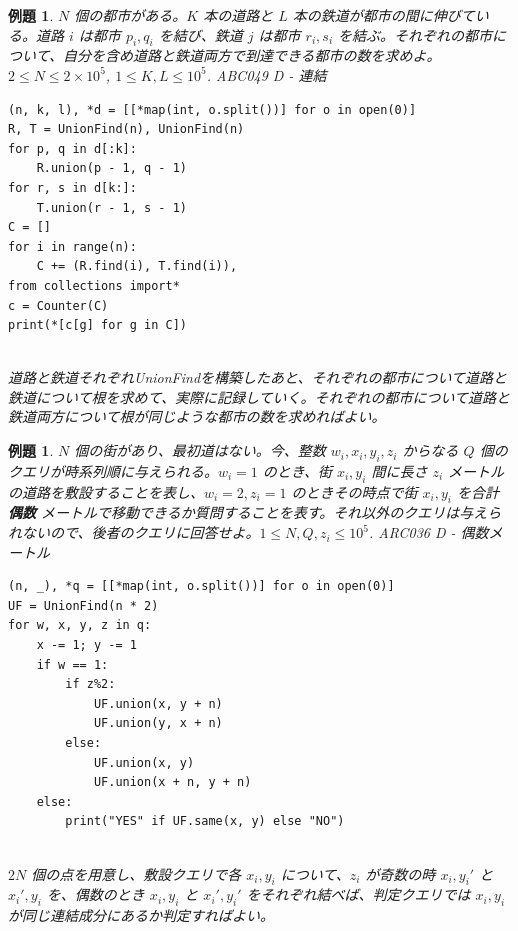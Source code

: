 \documentclass[12pt, a4j]{ltjsarticle}
\newtheorem{exm}[thm]{例題}
\newcommand*{\SS}{\vspace{1cm}}
\begin{document}
\SS

\begin{exm} $N$ 個の都市がある。$K$ 本の道路と $L$ 本の鉄道が都市の間に伸びている。道路 $i$ は都市 $p_i,q_i$ を結び、鉄道 $j$ は都市 $r_i,s_i$ を結ぶ。それぞれの都市について、自分を含め道路と鉄道両方で到達できる都市の数を求めよ。$2\le N \le 2\times 10^5$, $1\le K,L\le 10^5$. \upshape\quad ABC049 D - 連結\\
\begin{lstlisting}
(n, k, l), *d = [[*map(int, o.split())] for o in open(0)]
R, T = UnionFind(n), UnionFind(n)
for p, q in d[:k]:
    R.union(p - 1, q - 1)
for r, s in d[k:]:
    T.union(r - 1, s - 1)
C = []
for i in range(n):
    C += (R.find(i), T.find(i)),
from collections import*
c = Counter(C)
print(*[c[g] for g in C])
\end{lstlisting}\quad\\
道路と鉄道それぞれUnionFindを構築したあと、それぞれの都市について道路と鉄道について根を求めて、実際に記録していく。それぞれの都市について道路と鉄道両方について根が同じような都市の数を求めればよい。
\end{exm}

\SS

\begin{exm} $N$ 個の街があり、最初道はない。今、整数 $w_i,x_i,y_i,z_i$ からなる $Q$ 個のクエリが時系列順に与えられる。$w_i = 1$ のとき、街 $x_i,y_i$ 間に長さ $z_i$ メートルの道路を敷設することを表し、$w_i = 2, z_i = 1$ のときその時点で街 $x_i,y_i$ を合計 {\bf 偶数} メートルで移動できるか質問することを表す。それ以外のクエリは与えられないので、後者のクエリに回答せよ。$1\le N,Q,z_i\le 10^5$. \upshape\quad ARC036 D - 偶数メートル\\
\begin{lstlisting}
(n, _), *q = [[*map(int, o.split())] for o in open(0)]
UF = UnionFind(n * 2)
for w, x, y, z in q:
    x -= 1; y -= 1
    if w == 1:
        if z%2:
            UF.union(x, y + n)
            UF.union(y, x + n)
        else:
            UF.union(x, y)
            UF.union(x + n, y + n)
    else:
        print("YES" if UF.same(x, y) else "NO")
\end{lstlisting}\quad\\
$2N$ 個の点を用意し、敷設クエリで各 $x_i,y_i$ について、$z_i$ が奇数の時 $x_i,y_i'$ と $x_i',y_i$ を、偶数のとき $x_i,y_i$ と $x_i',y_i'$ をそれぞれ結べば、判定クエリでは $x_i,y_i$ が同じ連結成分にあるか判定すればよい。
\end{exm}

\SS
\end{document}
